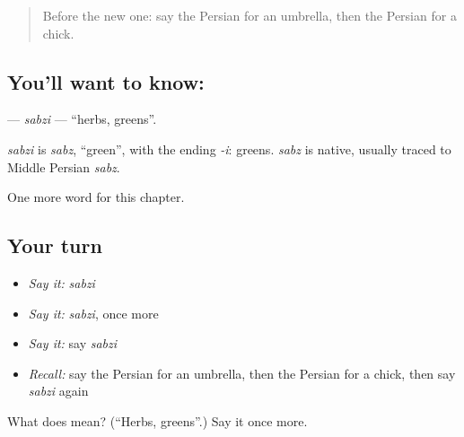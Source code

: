 \begin{quote}
Before the new one: say the Persian for an umbrella, then the Persian for a chick.
\end{quote}

\subsection*{You'll want to know: }
\textbf{} — \emph{sabzi} — \textquotedblleft{}herbs, greens\textquotedblright{}.

\begin{cousinweb}
\emph{sabzi} is \emph{sabz}, \textquotedblleft{}green\textquotedblright{}, with the ending \emph{-i}: greens. \emph{sabz} is native, usually traced to Middle Persian \emph{sabz}.
\end{cousinweb}

\begin{grammarlens}[title={What you've built}]
One more word for this chapter.
\end{grammarlens}

\subsection*{Your turn}
\begin{itemize}
\raggedright
  \item \emph{Say it:} \emph{sabzi}
  \item \emph{Say it:} \emph{sabzi}, once more
  \item \emph{Say it:} say \emph{sabzi}
  \item \emph{Recall:} say the Persian for an umbrella, then the Persian for a chick, then say \emph{sabzi} again
\end{itemize}

\begin{tcolorbox}[breakable,colback=teal!4,colframe=teal!35!black,title={Before you move on}]
What does  mean? (\textquotedblleft{}Herbs, greens\textquotedblright{}.) Say it once more.
\end{tcolorbox}
